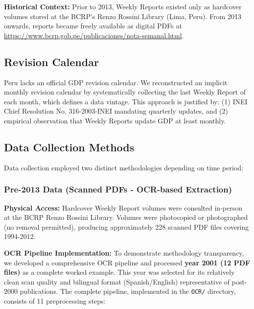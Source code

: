 \documentclass[12pt]{article}
\begin{document}
\textbf{Historical Context:} Prior to 2013, Weekly Reports existed only as hardcover volumes stored at the BCRP's Renzo Rossini Library (Lima, Peru). From 2013 onwards, reports became freely available as digital PDFs at \url{https://www.bcrp.gob.pe/publicaciones/nota-semanal.html}.

\subsection*{Revision Calendar}

Peru lacks an official GDP revision calendar. We reconstructed an implicit monthly revision calendar by systematically collecting the last Weekly Report of each month, which defines a data vintage. This approach is justified by: (1) INEI Chief Resolution No. 316-2003-INEI mandating quarterly updates, and (2) empirical observation that Weekly Reports update GDP at least monthly.

\subsection*{Data Collection Methods}

Data collection employed two distinct methodologies depending on time period:

\subsubsection*{Pre-2013 Data (Scanned PDFs - OCR-based Extraction)}

\textbf{Physical Access:} Hardcover Weekly Report volumes were consulted in-person at the BCRP Renzo Rossini Library. Volumes were photocopied or photographed (no removal permitted), producing approximately 228 scanned PDF files covering 1994-2012.

\textbf{OCR Pipeline Implementation:} To demonstrate methodology transparency, we developed a comprehensive OCR pipeline and processed \textbf{year 2001 (12 PDF files)} as a complete worked example. This year was selected for its relatively clean scan quality and bilingual format (Spanish/English) representative of post-2000 publications. The complete pipeline, implemented in the \texttt{OCR/} directory, consists of 11 preprocessing steps:
\end{document}
